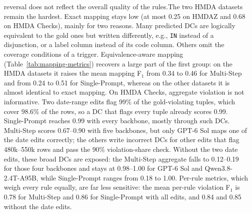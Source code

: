 {reversal does not reflect the overall quality of the rules.}{The two HMDA datasets remain the hardest. Exact mapping stays low (at most 0.25 on HMDAZ and 0.68 on HMDA Checks), mainly for two reasons. Many predicted DCs are logically equivalent to the gold ones but written differently, e.g., \texttt{IN} instead of a disjunction, or a label column instead of its code column. Others omit the coverage conditions of a trigger. Equivalence-aware mapping (Table~\ref{tab:mapping-metrics}) recovers a large part of the first group: on the HMDA datasets it raises the mean mapping F$_1$ from 0.34 to 0.46 for Multi-Step and from 0.24 to 0.51 for Single-Prompt, whereas on the other datasets it is almost identical to exact mapping. On HMDA Checks, aggregate violation is not informative. Two date-range edits flag 99\% of the gold-violating tuples, which cover 98.6\% of the rows, so a DC that flags every tuple already scores 0.99. Single-Prompt reaches 0.99 with every backbone, mostly through such DCs. Multi-Step scores 0.67--0.90 with five backbones, but only GPT-6 Sol maps one of the date edits correctly; the others write incorrect DCs for other edits that flag 480k--550k rows and pass the 90\% violation-share check. Without the two date edits, these broad DCs are exposed: the Multi-Step aggregate falls to 0.12--0.19 for those four backbones and stays at 0.98--1.00 for GPT-6 Sol and Qwen3.8-2.4T-A95B, while Single-Prompt ranges from 0.18 to 1.00. Per-rule metrics, which weigh every rule equally, are far less sensitive: the mean per-rule violation F$_1$ is 0.78 for Multi-Step and 0.86 for Single-Prompt with all edits, and 0.84 and 0.85 without the date edits.}

\begin{table}[!ht]
  \centering
  \small
  \setlength{\tabcolsep}{3.5pt}
  \resizebox{\columnwidth}{!}{}
  \caption{Mean mapping quality over the six datasets (ground-truth sentences
  only). CM: exact mapping F$_1$; CM$_{\equiv}$: equivalence-aware mapping
  F$_1$; AV: aggregate violation F$_1$; Rule-F$_1$: mean per-rule violation F$_1$;
  Exec.: execution equivalence; Fail.: sentences with no valid model output.}
  \label{tab:mapping-metrics}
\end{table}

